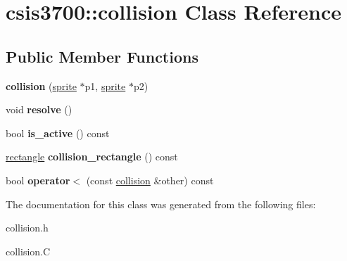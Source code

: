 \hypertarget{classcsis3700_1_1collision}{\section{csis3700\-:\-:collision Class Reference}
\label{classcsis3700_1_1collision}
}
\subsection*{Public Member Functions}
\begin{DoxyCompactItemize}
\item 
\hypertarget{classcsis3700_1_1collision_a28ce4cf4d73a43840adaf882a7f680da}{{\bfseries collision} (\hyperlink{classcsis3700_1_1sprite}{sprite} $\ast$p1, \hyperlink{classcsis3700_1_1sprite}{sprite} $\ast$p2)}\label{classcsis3700_1_1collision_a28ce4cf4d73a43840adaf882a7f680da}

\item 
\hypertarget{classcsis3700_1_1collision_a5a0054399a8f03e0ad9b10c70ced45c0}{void {\bfseries resolve} ()}\label{classcsis3700_1_1collision_a5a0054399a8f03e0ad9b10c70ced45c0}

\item 
\hypertarget{classcsis3700_1_1collision_ab3e4b0edb6c96d2ea25e0c7eddcae79e}{bool {\bfseries is\-\_\-active} () const }\label{classcsis3700_1_1collision_ab3e4b0edb6c96d2ea25e0c7eddcae79e}

\item 
\hypertarget{classcsis3700_1_1collision_afa074671651c61167ebac3f13a629931}{\hyperlink{classcsis3700_1_1rectangle}{rectangle} {\bfseries collision\-\_\-rectangle} () const }\label{classcsis3700_1_1collision_afa074671651c61167ebac3f13a629931}

\item 
\hypertarget{classcsis3700_1_1collision_a5d82964543afa431f20467978e8c24bc}{bool {\bfseries operator$<$} (const \hyperlink{classcsis3700_1_1collision}{collision} \&other) const }\label{classcsis3700_1_1collision_a5d82964543afa431f20467978e8c24bc}

\end{DoxyCompactItemize}


The documentation for this class was generated from the following files\-:\begin{DoxyCompactItemize}
\item 
collision.\-h\item 
collision.\-C\end{DoxyCompactItemize}
